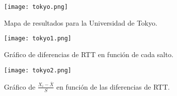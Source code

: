 \begin{figure}[H]
\texttt{[image: tokyo.png]}
\caption{Mapa de resultados para la Universidad de Tokyo.}
\label{mapa1}
\end{figure}

\begin{figure}[H]
\centering
\texttt{[image: tokyo1.png]}
\caption{Gráfico de diferencias de RTT en función de cada salto.}
\label{diff1}
\end{figure}

\begin{figure}[H]
\centering
\texttt{[image: tokyo2.png]}
\caption{Gráfico de $\frac{X_i - \bar{X}}{S}$ en función de las diferencias de RTT.}
\label{sdev1}
\end{figure}